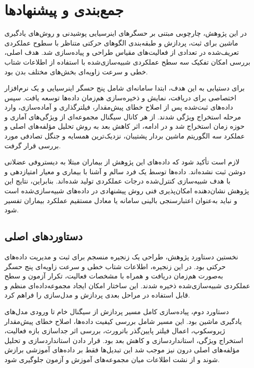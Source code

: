 \section{جمع‌بندی و پیشنهادها}

در این پژوهش، چارچوبی مبتنی بر حسگرهای اینرسیایی پوشیدنی و روش‌های یادگیری ماشین برای ثبت، پردازش و طبقه‌بندی الگوهای حرکتی متناظر با سطوح عملکردی تعریف‌شده در تعدادی از فعالیت‌های مقیاس  طراحی و پیاده‌سازی شد. هدف اصلی، بررسی امکان تفکیک سه سطح عملکردی شبیه‌سازی‌شده با استفاده از اطلاعات شتاب خطی و سرعت زاویه‌ای بخش‌های مختلف بدن بود.

برای دستیابی به این هدف، ابتدا سامانه‌ای شامل پنج حسگر اینرسیایی و یک نرم‌افزار اختصاصی برای دریافت، نمایش و ذخیره‌سازی هم‌زمان داده‌ها توسعه یافت. سپس داده‌های ثبت‌شده پس از اصلاح خطای پیش‌مقدار، فیلترگذاری و آماده‌سازی، وارد مرحله استخراج ویژگی شدند. از هر کانال سیگنال مجموعه‌ای از ویژگی‌های آماری و حوزه زمان استخراج شد و در ادامه، اثر کاهش بعد به روش تحلیل مؤلفه‌های اصلی و عملکرد سه الگوریتم ماشین بردار پشتیبان، نزدیک‌ترین همسایه و جنگل تصادفی مورد بررسی قرار گرفت.

لازم است تأکید شود که داده‌های این پژوهش از بیماران مبتلا به دیستروفی عضلانی دوشن ثبت نشده‌اند. داده‌ها توسط یک فرد سالم و آشنا با بیماری و معیار امتیازدهی  و با هدف شبیه‌سازی کنترل‌شده درجات عملکردی تولید شده‌اند. بنابراین، نتایج این پژوهش نشان‌دهنده امکان‌پذیری فنی روش پیشنهادی در داده‌های شبیه‌سازی‌شده است و نباید به‌عنوان اعتبارسنجی بالینی سامانه یا معادل مستقیم عملکرد بیماران تفسیر شود.

\subsection{دستاوردهای اصلی}

نخستین دستاورد پژوهش، طراحی یک زنجیره منسجم برای ثبت و مدیریت داده‌های حرکتی بود. در این زنجیره، اطلاعات شتاب خطی و سرعت زاویه‌ای پنج حسگر به‌صورت هم‌زمان دریافت و همراه با مشخصات فعالیت، تکرار آزمون و سطح عملکردی شبیه‌سازی‌شده ذخیره شدند. این ساختار امکان ایجاد مجموعه‌داده‌ای منظم و قابل استفاده در مراحل بعدی پردازش و مدل‌سازی را فراهم کرد.

دستاورد دوم، پیاده‌سازی کامل مسیر پردازش از سیگنال خام تا ورودی مدل‌های یادگیری ماشین بود. این مسیر شامل بررسی کیفیت داده‌ها، اصلاح خطای پیش‌مقدار ژیروسکوپ، اعمال فیلتر پایین‌گذر باترورث، بررسی اثر جداسازی بازه فعالیت، استخراج ویژگی، استانداردسازی و کاهش بعد بود. قرار دادن استانداردسازی و تحلیل مؤلفه‌های اصلی درون  نیز موجب شد این تبدیل‌ها فقط بر داده‌های آموزشی برازش شوند و از نشت اطلاعات میان مجموعه‌های آموزش و آزمون جلوگیری شود.

